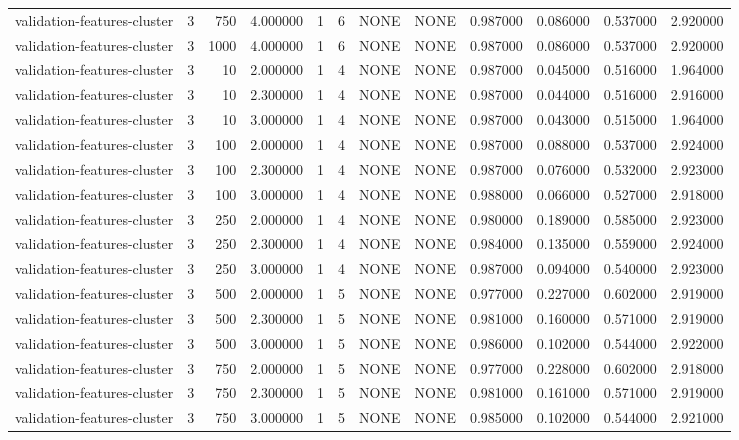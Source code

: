 \begin{tabular}{lrrrllllrrrr}
validation-features-cluster & 3 & 750 & 4.000000 & 1 & 6 & NONE & NONE & 0.987000 & 0.086000 & 0.537000 & 2.920000 \\
validation-features-cluster & 3 & 1000 & 4.000000 & 1 & 6 & NONE & NONE & 0.987000 & 0.086000 & 0.537000 & 2.920000 \\
validation-features-cluster & 3 & 10 & 2.000000 & 1 & 4 & NONE & NONE & 0.987000 & 0.045000 & 0.516000 & 1.964000 \\
validation-features-cluster & 3 & 10 & 2.300000 & 1 & 4 & NONE & NONE & 0.987000 & 0.044000 & 0.516000 & 2.916000 \\
validation-features-cluster & 3 & 10 & 3.000000 & 1 & 4 & NONE & NONE & 0.987000 & 0.043000 & 0.515000 & 1.964000 \\
validation-features-cluster & 3 & 100 & 2.000000 & 1 & 4 & NONE & NONE & 0.987000 & 0.088000 & 0.537000 & 2.924000 \\
validation-features-cluster & 3 & 100 & 2.300000 & 1 & 4 & NONE & NONE & 0.987000 & 0.076000 & 0.532000 & 2.923000 \\
validation-features-cluster & 3 & 100 & 3.000000 & 1 & 4 & NONE & NONE & 0.988000 & 0.066000 & 0.527000 & 2.918000 \\
validation-features-cluster & 3 & 250 & 2.000000 & 1 & 4 & NONE & NONE & 0.980000 & 0.189000 & 0.585000 & 2.923000 \\
validation-features-cluster & 3 & 250 & 2.300000 & 1 & 4 & NONE & NONE & 0.984000 & 0.135000 & 0.559000 & 2.924000 \\
validation-features-cluster & 3 & 250 & 3.000000 & 1 & 4 & NONE & NONE & 0.987000 & 0.094000 & 0.540000 & 2.923000 \\
validation-features-cluster & 3 & 500 & 2.000000 & 1 & 5 & NONE & NONE & 0.977000 & 0.227000 & 0.602000 & 2.919000 \\
validation-features-cluster & 3 & 500 & 2.300000 & 1 & 5 & NONE & NONE & 0.981000 & 0.160000 & 0.571000 & 2.919000 \\
validation-features-cluster & 3 & 500 & 3.000000 & 1 & 5 & NONE & NONE & 0.986000 & 0.102000 & 0.544000 & 2.922000 \\
validation-features-cluster & 3 & 750 & 2.000000 & 1 & 5 & NONE & NONE & 0.977000 & 0.228000 & 0.602000 & 2.918000 \\
validation-features-cluster & 3 & 750 & 2.300000 & 1 & 5 & NONE & NONE & 0.981000 & 0.161000 & 0.571000 & 2.919000 \\
validation-features-cluster & 3 & 750 & 3.000000 & 1 & 5 & NONE & NONE & 0.985000 & 0.102000 & 0.544000 & 2.921000 \\

\end{tabular}
